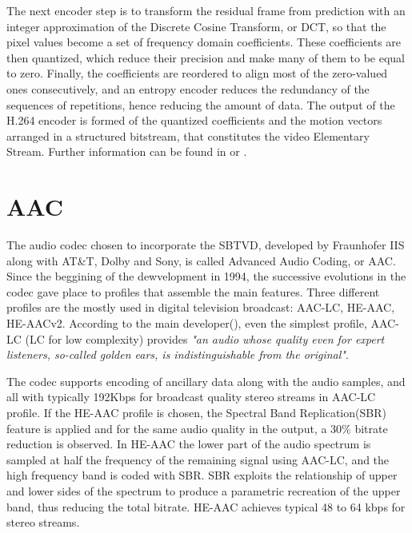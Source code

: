 \documentclass[
	12pt,				%
	openright,			%
	twoside,			%
	a4paper,			%
	brazil,
	french,				%
	english
	]{abntex2}
\begin{document}
The next encoder step is to transform the residual frame from prediction with an integer approximation of the Discrete Cosine Transform, or DCT, so that the pixel values become a set of frequency domain coefficients. These coefficients are then quantized, which reduce their precision and make many of them to be equal to zero. Finally, the coefficients are reordered to align most of the zero-valued ones consecutively, and an entropy encoder reduces the redundancy of the sequences of repetitions, hence reducing the amount of data. The output of the H.264 encoder is formed of the quantized coefficients and the motion vectors arranged in a structured bitstream, that constitutes the video Elementary Stream. Further information can be found in \cite{vcodex} or \cite{richardson}.

\section{AAC}

The audio codec chosen to incorporate the SBTVD, developed by Fraunhofer IIS along with AT\&T, Dolby and Sony, is called Advanced Audio Coding, or AAC. Since the beggining of the dewvelopment in 1994, the successive evolutions in the codec gave place to profiles that assemble the main features. Three different profiles are the mostly used in digital television broadcast: AAC-LC, HE-AAC, HE-AACv2. According to the main developer(\cite{fraunhofer}), even the simplest profile, AAC-LC (LC for low complexity) provides \textit{"an audio whose quality even for expert listeners, so-called golden ears, is indistinguishable from the original"}.

The codec supports encoding of ancillary data along with the audio samples, and all with typically 192Kbps for broadcast quality stereo streams in AAC-LC profile. If the HE-AAC profile is chosen, the Spectral Band Replication(SBR) feature is applied and for the same audio quality in the output, a 30\% bitrate reduction is observed. In HE-AAC the lower part of the audio spectrum is sampled at half the frequency of the remaining signal using AAC-LC, and the high frequency band is coded with SBR. SBR exploits the relationship of upper and lower sides of the spectrum to produce a parametric recreation of the upper band, thus reducing the total bitrate. HE-AAC achieves typical 48 to 64 kbps for stereo streams.
\end{document}
